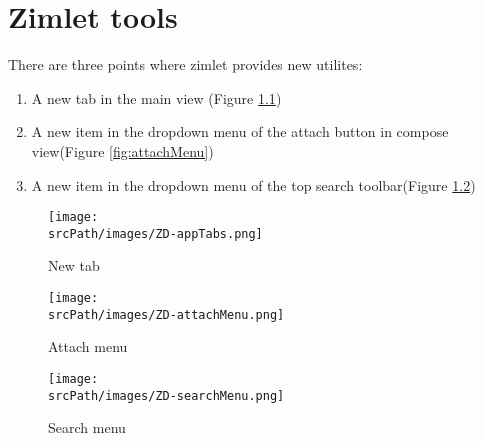 \chapter{Zimlet tools}

There are three points where zimlet provides new utilites:
\begin{enumerate}
    \item{A new tab in the main view (Figure \ref{fig:appTab})}
    \item{A new item in the dropdown menu of the attach button in compose view(Figure \ref{fig:attachMenu})}
    \item{A new item in the dropdown menu of the top search toolbar(Figure \ref{fig:searchMenu})}
\end{enumerate}

\begin{figure}[htbp,!h] 
\centering 
\texttt{[image: \\srcPath/images/ZD-appTabs.png]} 
\caption{New tab} 
\label{fig:appTab}
\end{figure}
\begin{figure}[htbp,!h]
    \centering
    \begin{minipage}{0.45\textwidth}
        \centering
        \texttt{[image: \\srcPath/images/ZD-attachMenu.png]} %
        \caption{Attach menu}
        \label{fig:attachMenu}
    \end{minipage}
    \hfill
    \begin{minipage}{0.45\textwidth}
        \centering
        \texttt{[image: \\srcPath/images/ZD-searchMenu.png]} %
        \caption{Search menu}
        \label{fig:searchMenu}
    \end{minipage}
\end{figure}




